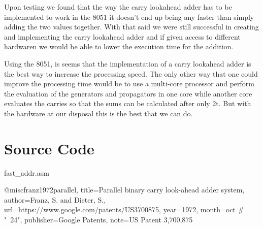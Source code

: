 \documentclass[journal]{IEEEtran}
\begin{document}
Upon testing we found that the way the carry lookahead adder has to be
implemented to work in the 8051 it doesn't end up being any faster than simply
adding the two values together. With that said we were still successful in
creating and implementing the carry lookahead adder and if given access to
different hardwaren we would be able to lower the execution time for the
addition.

Using the 8051, is seems that the implementation of a carry lookahead adder is
the best way to increase the processing speed. The only other way that one could
improve the processing time would be to use a multi-core processor and perform
the evaluation of the generators and propagators in one core while another core
evaluates the carries so that the sums can be calculated after only 2t. But with
the hardware at our disposal this is the best that we can do.

\section{Source Code}\label{sec:code}


{fast_addr.asm}

\begin{thebibliography}{99}

	@misc{franz1972parallel,
	  title={Parallel binary carry look-ahead adder system},
	  author={Franz, S. and Dieter, S.},
	  url={https://www.google.com/patents/US3700875},
	  year={1972},
	  month=oct # "~24",
	  publisher={Google Patents},
	  note={US Patent 3,700,875}
	}


\end{thebibliography}
\end{document}
